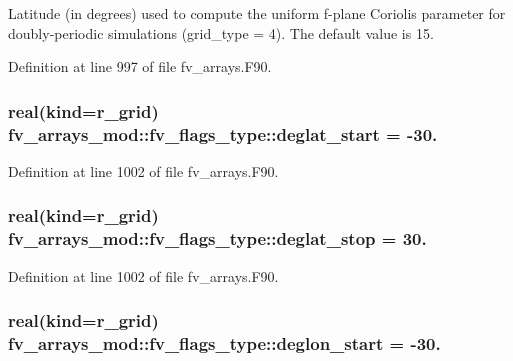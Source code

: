 Latitude (in degrees) used to compute the uniform f-\/plane Coriolis parameter for doubly-\/periodic simulations (grid\-\_\-type = 4). The default value is 15. 



Definition at line 997 of file fv\-\_\-arrays.\-F90.

\subsubsection[{deglat\-\_\-start}]{\setlength{\rightskip}{0pt plus 5cm}real(kind={\bf r\-\_\-grid}) fv\-\_\-arrays\-\_\-mod\-::fv\-\_\-flags\-\_\-type\-::deglat\-\_\-start = -\/30.}\label{structfv__arrays__mod_1_1fv__flags__type_a241a60bdb1c3513da1bbe1964d689347}


Definition at line 1002 of file fv\-\_\-arrays.\-F90.

\subsubsection[{deglat\-\_\-stop}]{\setlength{\rightskip}{0pt plus 5cm}real(kind={\bf r\-\_\-grid}) fv\-\_\-arrays\-\_\-mod\-::fv\-\_\-flags\-\_\-type\-::deglat\-\_\-stop = 30.}\label{structfv__arrays__mod_1_1fv__flags__type_a3433f6e5c4398683f9ce32f3c2e2e357}


Definition at line 1002 of file fv\-\_\-arrays.\-F90.

\subsubsection[{deglon\-\_\-start}]{\setlength{\rightskip}{0pt plus 5cm}real(kind={\bf r\-\_\-grid}) fv\-\_\-arrays\-\_\-mod\-::fv\-\_\-flags\-\_\-type\-::deglon\-\_\-start = -\/30.}\label{structfv__arrays__mod_1_1fv__flags__type_aa71d52d628975cba5995e1e17069c776}


